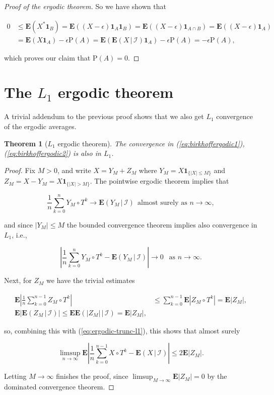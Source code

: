 \documentclass[11pt]{report}
\theoremstyle{plain}
\newtheorem{thm}{Theorem}[chapter]
\theoremstyle{definition}
\begin{document}
\begin{proof}[Proof of the ergodic theorem]
So we have shown that

\begin{align*}
0 &\le \mathbf{E}(X^*\mathbf{1}_B) = \mathbf{E}((X-\epsilon)\mathbf{1}_A \mathbf{1}_B) =
\mathbf{E}((X-\epsilon)\mathbf{1}_{A\cap B} ) = \mathbf{E}((X-\epsilon)\mathbf{1}_A ) \\&=
\mathbf{E}(X\mathbf{1}_A) - \epsilon \mathrm{P}(A)
= \mathbf{E}(\mathbf{E}\left(X\,|\,\mathcal{I}\right)\mathbf{1}_A) - \epsilon \mathrm{P}(A) = -\epsilon \mathrm{P}(A),
\end{align*}

which proves our claim that $\mathrm{P}(A)=0$.
\end{proof}

\section{The $L_1$ ergodic theorem}
A trivial addendum to the previous proof shows that we also get $L_1$ convergence of the ergodic averages.

\begin{thm}[$L_1$ ergodic theorem]
The convergence in (\ref{eq:birkhoffergodic1}), (\ref{eq:birkhoffergodic2}) is also in $L_1$.
\end{thm}

\begin{proof}
Fix $M>0$, and write $X=Y_M + Z_M$ where $Y_M = X \mathbf{1}_{\{|X|\le M\}}$ and $Z_M = X-Y_M = X \mathbf{1}_{\{|X|>M\}}$. The pointwise ergodic theorem implies that

\[
\frac{1}{n} \sum_{k=0}^n Y_M \circ T^k \to \mathbf{E}\left(Y_M\,|\,\mathcal{I}\right)
 \ \ \textrm{almost surely as }n\to\infty,
\]

and since $|Y_M|\le M$ the bounded convergence theorem implies also convergence in $L_1$, i.e.,

\begin{equation*} \tag{20}\label{eq:ergodic-trunc-l1}
\left|\frac{1}{n} \sum_{k=0}^n Y_M \circ T^k - \mathbf{E}\left(Y_M\,|\,\mathcal{I}\right)\right| \to 0 \ \ \textrm{ as }n\to\infty.
\end{equation*}

Next, for $Z_M$ we have the trivial estimates

\begin{align*}
\mathbf{E} \left| \frac{1}{n} \sum_{k=0}^{n-1} Z_M \circ T^k \right|
& \le \sum_{k=0}^{n-1} \mathbf{E}|Z_M \circ T^k| = \mathbf{E}|Z_M|, \\
\mathbf{E} \left| \mathbf{E}\left(Z_M\,|\,\mathcal{I}\right) \right| \le \mathbf{E} \mathbf{E}\left(|Z_M|\,|\,\mathcal{I}\right) = \mathbf{E}|Z_M|,
\end{align*}

so, combining this with (\ref{eq:ergodic-trunc-l1}), this shows that almost surely

\[
\limsup_{n\to\infty} \mathbf{E}\left| \frac{1}{n} \sum_{k=0}^{n-1} X\circ T^k - \mathbf{E}\left(X\,|\,\mathcal{I}\right)\right|
\le 2 \mathbf{E}|Z_M|.
\]

Letting $M\to\infty$ finishes the proof, since $\limsup_{M\to\infty} \mathbf{E}|Z_M| = 0$ by the dominated convergence theorem.
\end{proof}
\end{document}
